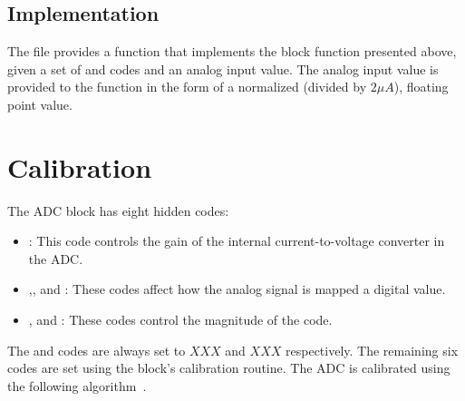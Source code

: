 \subsection{\analoglib Implementation}

The  file provides a  function that implements the
block function presented above, given a set of \dynamic and \static codes and an
analog input value. The analog input value is provided to the function in the
form of a normalized (divided by $2 \mu A$), floating point value. 


\section{Calibration}
The ADC block has eight hidden codes:

\begin{itemize}
\item{}: This code controls the gain of the internal current-to-voltage
  converter in the ADC.
\item{},, and : These codes affect
  how the analog signal is mapped a digital value.
\item{},  and : These codes control the magnitude of the
   code.
\end{itemize}

The  and  codes are always set to $XXX$ and $XXX$
respectively.  The remaining six codes are set using the block's calibration
routine. The ADC is calibrated using the following
algorithm~\cite{adc_calib.cpp}.

\begin{algorithmic}
        \EndFor
      \EndFor
    \EndFor
    \EndFor
    \EndFor
  \EndFor
  \State{}
  \EndFor
  \State{}
\end{algorithmic}

